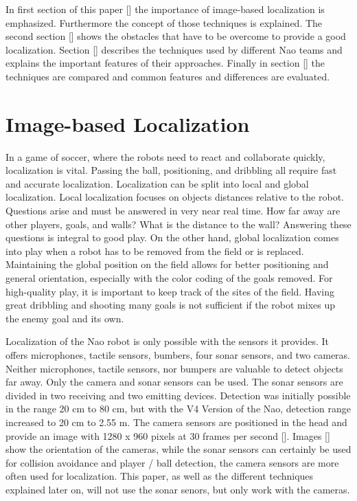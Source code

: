 \documentclass[12pt, a4paper]{scrartcl}
\begin{document}
  In first section of this paper [] the importance of image-based localization is emphasized. Furthermore the concept of those techniques is explained. The second section [] shows the obstacles that have to be overcome to provide a good localization. Section [] describes the techniques used by different Nao teams and explains the important features of their approaches. Finally in section [] the techniques are compared and common features and differences are evaluated.

  \section{Image-based Localization}
  In a game of soccer, where the robots need to react and collaborate quickly, localization is vital. Passing the ball, positioning, and dribbling all require fast and accurate localization. Localization can be split into local and global localization. Local localization focuses on objects distances relative to the robot. Questions arise and must be answered in very near real time. How far away are other players, goals, and walls? What is the distance to the wall? Answering these questions is integral to good play. On the other hand, global localization comes into play when a robot has to be removed from the field or is replaced. Maintaining the global position on the field allows for better positioning and general orientation, especially with the color coding of the goals removed. For high-quality play, it is important to keep track of the sites of the field. Having great dribbling and shooting many goals is not sufficient if the robot mixes up the enemy goal and its own.

  Localization of the Nao robot is only possible with the sensors it provides. It offers microphones, tactile sensors, bumbers, four sonar sensors, and two cameras. Neither microphones, tactile sensors, nor bumpers are valuable to detect objects far away. Only the camera and sonar sensors can be used. The sonar sensors are divided in two receiving and two emitting devices. Detection was initially possible in the range 20 cm to 80 cm, but with the V4 Version of the Nao, detection range increased to 20 cm to 2.55 m. The camera sensors are positioned in the head and provide an image with 1280 x 960 pixels at 30 frames per second []. Images [] show the orientation of the cameras, while the sonar sensors can certainly be used for collision avoidance and player / ball detection, the camera sensors are more often used for localization. This paper, as well as the different techniques explained later on, will not use the sonar senors, but only work with the cameras.
\end{document}
